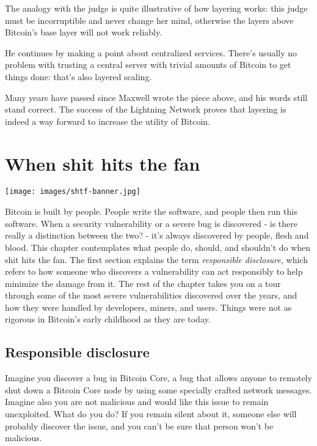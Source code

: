 The analogy with the judge is quite illustrative of how layering works:
this judge must be incorruptible and never change her mind, otherwise
the layers above Bitcoin's base layer will not work reliably.

He continues by making a point about centralized services. There's
usually no problem with trusting a central server with trivial amounts
of Bitcoin to get things done: that's also layered scaling.

Many years have passed since Maxwell wrote the piece above, and his
words still stand correct. The success of the Lightning Network proves
that layering is indeed a way forward to increase the utility of
Bitcoin.

\hypertarget{whenshithitsthefan}{%
\section{When shit hits the fan}\label{whenshithitsthefan}}

\texttt{[image: images/shtf-banner.jpg]}

Bitcoin is built by people. People write the software, and people then
run this software. When a security vulnerability or a severe bug is
discovered - is there really a distinction between the two? - it's
always discovered by people, flesh and blood. This chapter contemplates
what people do, should, and shouldn't do when shit hits the fan. The
first section explains the term \emph{responsible disclosure}, which
refers to how someone who discovers a vulnerability can act responsibly
to help minimize the damage from it. The rest of the chapter takes you
on a tour through some of the most severe vulnerabilities discovered
over the years, and how they were handled by developers, miners, and
users. Things were not as rigorous in Bitcoin's early childhood as they
are today.

\hypertarget{responsible-disclosure}{%
\subsection{Responsible disclosure}\label{responsible-disclosure}}

Imagine you discover a bug in Bitcoin Core, a bug that allows anyone to
remotely shut down a Bitcoin Core node by using some specially crafted
network messages. Imagine also you are not malicious and would like this
issue to remain unexploited. What do you do? If you remain silent about
it, someone else will probably discover the issue, and you can't be sure
that person won't be malicious.


